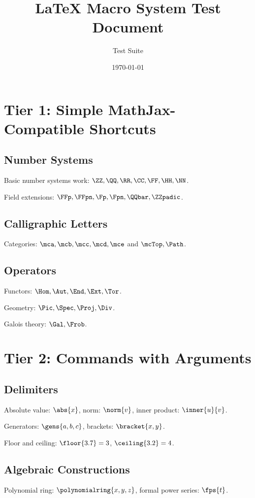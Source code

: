 \documentclass[11pt]{scrartcl}
\title{LaTeX Macro System Test Document}
\author{Test Suite}
\date{\today}
\begin{document}
\maketitle

\section{Tier 1: Simple MathJax-Compatible Shortcuts}

\subsection{Number Systems}
Basic number systems work: $\ZZ, \QQ, \RR, \CC, \FF, \HH, \NN$.

Field extensions: $\FFp, \FFpn, \Fp, \Fpn, \QQbar, \ZZpadic$.

\subsection{Calligraphic Letters}
Categories: $\mca, \mcb, \mcc, \mcd, \mce$ and $\mcTop, \Path$.

\subsection{Operators}
Functors: $\Hom, \Aut, \End, \Ext, \Tor$.

Geometry: $\Pic, \Spec, \Proj, \Div$.

Galois theory: $\Gal, \Frob$.

\section{Tier 2: Commands with Arguments}

\subsection{Delimiters}
Absolute value: $\abs{x}$, norm: $\norm{v}$, inner product: $\inner{u}{v}$.

Generators: $\gens{a, b, c}$, brackets: $\bracket{x, y}$.

Floor and ceiling: $\floor{3.7} = 3$, $\ceiling{3.2} = 4$.

\subsection{Algebraic Constructions}
Polynomial ring: $\polynomialring{x, y, z}$, formal power series: $\fps{t}$.
\end{document}
